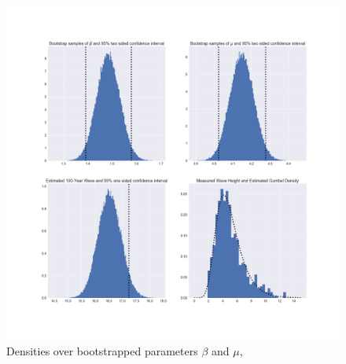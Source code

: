 \documentclass[a4paper]{article}
\begin{document}
\begin{figure}[H]
    \centering
    \includegraphics[width = 1.0\textwidth]{images/results_bootstrap.png}
    \caption{Densities over bootstrapped parameters $\beta$ and $\mu$, }
    \label{fig:bootstrap_res}
\end{figure}
\end{document}
